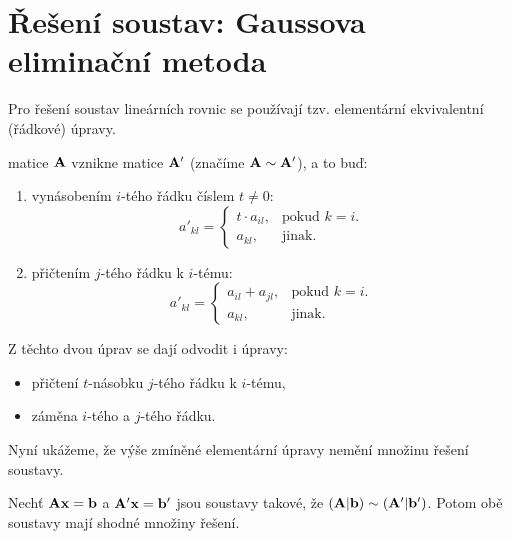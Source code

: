 \section{Řešení soustav: Gaussova eliminační metoda}

Pro řešení soustav lineárních rovnic se používají tzv. elementární
ekvivalentní (řádkové) úpravy.

\begin{definition}
     matice $\mathbf{A}$ vznikne matice $\mathbf{A'}$ 
    (značíme $\mathbf{A} \sim \mathbf{A'}$), a to buď:
    \begin{enumerate}
        \item vynásobením $i$-tého řádku číslem $t \neq 0$:
            \begin{equation*}
                  a'_{kl} = \begin{cases}
                      t \cdot a_{il}, & \text{pokud $k=i$}.\\
                      a_{kl}, & \text{jinak}.
                        \end{cases}
            \end{equation*}
        \item přičtením $j$-tého řádku k $i$-tému:
            \begin{equation*}
                  a'_{kl} = \begin{cases}
                      a_{il} + a_{jl}, & \text{pokud $k=i$}.\\
                      a_{kl}, & \text{jinak}.
                        \end{cases}
            \end{equation*}
    \end{enumerate}
\end{definition}

\begin{remark}
    Z těchto dvou úprav se dají odvodit i úpravy:
    \begin{itemize}
        \item přičtení $t$-násobku $j$-tého řádku k $i$-tému,
        \item záměna $i$-tého a $j$-tého řádku.
    \end{itemize}
\end{remark}

Nyní ukážeme, že výše zmíněné elementární úpravy nemění množinu řešení 
soustavy.

\begin{theorem}
    Nechť $\mathbf{A}\mathbf{x}=\mathbf{b}$ a $\mathbf{A'}\mathbf{x}=\mathbf{b'}$ jsou
    soustavy takové, že $(\mathbf{A}|\mathbf{b}) \sim (\mathbf{A'}|\mathbf{b'})$. 
        Potom obě soustavy mají shodné množiny řešení.
\end{theorem}

